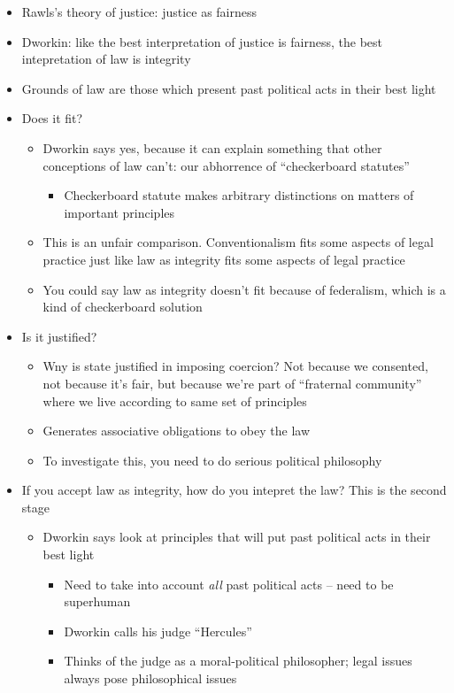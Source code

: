 \begin{itemize}
\tightlist
\item
  Rawls's theory of justice: justice as fairness
\item
  Dworkin: like the best interpretation of justice is fairness, the best
  intepretation of law is integrity
\item
  Grounds of law are those which present past political acts in their
  best light
\item
  Does it fit?

  \begin{itemize}
  \tightlist
  \item
    Dworkin says yes, because it can explain something that other
    conceptions of law can't: our abhorrence of ``checkerboard
    statutes''

    \begin{itemize}
    \tightlist
    \item
      Checkerboard statute makes arbitrary distinctions on matters of
      important principles
    \end{itemize}
  \item
    This is an unfair comparison. Conventionalism fits some aspects of
    legal practice just like law as integrity fits some aspects of legal
    practice
  \item
    You could say law as integrity doesn't fit because of federalism,
    which is a kind of checkerboard solution
  \end{itemize}
\item
  Is it justified?

  \begin{itemize}
  \tightlist
  \item
    Wny is state justified in imposing coercion? Not because we
    consented, not because it's fair, but because we're part of
    ``fraternal community'' where we live according to same set of
    principles
  \item
    Generates associative obligations to obey the law
  \item
    To investigate this, you need to do serious political philosophy
  \end{itemize}
\item
  If you accept law as integrity, how do you intepret the law? This is
  the second stage

  \begin{itemize}
  \tightlist
  \item
    Dworkin says look at principles that will put past political acts in
    their best light

    \begin{itemize}
    \tightlist
    \item
      Need to take into account \emph{all} past political acts -- need
      to be superhuman
    \item
      Dworkin calls his judge ``Hercules''
    \item
      Thinks of the judge as a moral-political philosopher; legal issues
      always pose philosophical issues
    \end{itemize}
  \end{itemize}
\end{itemize}

